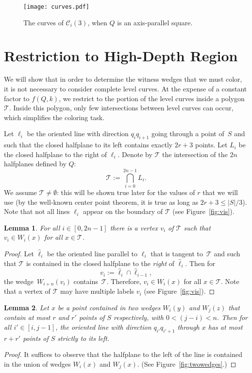 \documentclass[english,11pt]{article}
\newtheorem{lemma}{Lemma}
\newcommand{\bigc}{\mathcal C}
\newcommand{\bigt}{\mathcal T}
\begin{document}
\begin{figure}[htb]
\begin{center}
\texttt{[image: curves.pdf]}
\end{center}
\caption{\label{fig:curves} The curves of $\bigc_i (3)$, when $Q$ is an axis-parallel square.}
\end{figure}

\section{Restriction to High-Depth Region}
\label{sec:truncation}
We will show that in order to determine the witness wedges that we must  color, it is not necessary to consider complete level curves. At the expense of a constant factor to $f(Q,k)$, we restrict to the portion of the level curves inside a polygon $\bigt$. Inside this polygon, only few intersections between level curves can occur, which simplifies the coloring task.\medskip 

Let $\ell_i$ be the oriented line with
direction $q_iq_{i{+}1}$ going through a point of~$S$
and such that the closed halfplane to its left
contains exactly $2r{+}3$ points.
Let $L_i$ be the closed halfplane to the right of $\ell_i$.
Denote by $\bigt$  the intersection of the $2n$ halfplanes defined by $Q$:
$$
\bigt := \bigcap_{i=0}^{2n{-}1} L_i.
$$
We assume $\bigt\not=\emptyset$: this will be shown true later for the
values of $r$ that we will use (by the well-known center point theorem, it is true as long as $2r{+}3\le |S|/3$). Note that not all lines $\ell_i$
appear on the boundary of $\bigt$ (see Figure~\ref{fig:vis}).

\begin{lemma}
\label{lem:vis}
For all $i\in[0,2n{-}1]$ there is a vertex $v_i$ of $\bigt$ such that
$v_i\in W_i(x)$ for all $x\in\bigt$.
\end{lemma}
\begin{proof}
Let $\hat\ell_i$ be the oriented line parallel to $\ell_i$ that is tangent to~$\bigt$ and such that $\bigt$ is contained in the closed halfplane to the {\em right} of $\hat\ell_i$.
Then for 
$$
v_i := \hat\ell_i\cap\hat\ell_{i{-}1},
$$ 
the wedge~$W_{i{+}n}(v_i)$ contains~$\bigt$. Therefore, $v_i\in W_i(x)$ for all $x\in\bigt$.
Note  that a vertex of $\bigt$ may have multiple labels $v_i$ (see Figure~\ref{fig:vis}).
\end{proof}

\begin{lemma}\label{lem:twowedges}
Let $x$ be a point contained in two wedges $W_i(y)$ and
$W_j(z)$ that  contain at most $r$ and $r'$ points of $S$ respectively, with $0<(j{-}i)<n$. 
Then for all $i'\in [i,j{-}1]$, the oriented line
with direction $q_{i'}q_{i'{+}1}$ through $x$ has at most $r{+}r'$ points
of $S$ strictly to its left.
\end{lemma}
\begin{proof}
It suffices to observe that the halfplane to the left of the line is contained in the union of  wedges $W_i(x)$ and $W_j(x)$.
(See Figure~\ref{fig:twowedges}.)
\end{proof}
\end{document}

